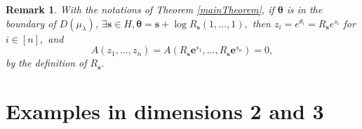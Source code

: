 \documentclass[a4paper,oneside,notitlepage]{article}%
\newtheorem{remark}[theorem]{Remark}
\begin{document}
\begin{description}
\begin{remark}
\label{mainremark}With the notations of Theorem \ref{mainTheorem}, if
$\boldsymbol{\theta}$ is in the boundary of $D\left(  \mu_{\lambda}\right)  $,
$\exists\mathbf{s}\in H,\boldsymbol{\theta}=\mathbf{s}+\log R_{\mathbf{s}%
}\left(  1,\ldots,1\right)  ,$ then $z_{i}=$\textbf{$e$}$^{\theta_{i}%
}=R_{\mathbf{s}}$\textbf{$e$}$^{s_{i}}$ for $i\in\left[  n\right]  ,$ and
\[
A\left(  z_{1},\ldots,z_{n}\right)  =A\left(  R_{\mathbf{s}}\mathbf{e}^{s_{1}%
},\ldots,R_{\mathbf{s}}\mathbf{e}^{s_{n}}\right)  =0,
\]
by the definition of $R_{\mathbf{s}}.$
\end{remark}
\end{description}

\section{Examples in dimensions 2 and 3}
\end{document}
